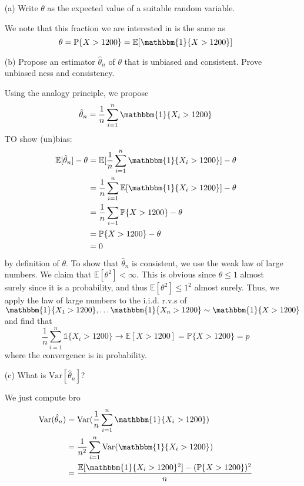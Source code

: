 \documentclass[11pt]{article}
\newcommand{\Var}{\text{Var}}
\newcommand{\bbE}{\mathbb{E}}
\newcommand{\bbP}{\mathbb{P}}
\begin{document}
\begin{enumerate}
    \item[(a)] Write \( \theta \) as the expected value of a suitable random variable.
\begin{solution}
    We note that this fraction we are interested in is the same as
    \[\theta = \bbP\{X >1200\}  = \bbE[\mathbbm{1}\{X>1200\}]\]
\end{solution}
    \item[(b)] Propose an estimator \( \hat{\theta}_n \) of \( \theta \) that is unbiased and consistent. Prove unbiased ness and consistency.
    \begin{solution}
        Using the analogy principle, we propose 
        \[\hat{\theta}_n = \frac{1}{n} \sum_{i=1}^n \mathbbm{1}\{X_i >1200\}\] TO show (un)bias:
        \begin{align*}
            \bbE[\hat{\theta}_n] - \theta &= \bbE[\frac{1}{n} \sum_{i=1}^n \mathbbm{1}\{X_i >1200\}] - \theta\\
            &= \frac{1}{n} \sum_{i=1}^n \bbE[\mathbbm{1}\{X_i > 1200\}] - \theta\\
            &= \frac{1}{n}\sum_{i-1} \bbP\{X > 1200\} - \theta\\
            &= \bbP\{X >1200\} - \theta\\
            &= 0
        \end{align*} by definition of $\theta$. To show that $\hat{\theta}_n$ is consistent, we use the weak law of large numbers. We claim that $\bbE[\theta^2] < \infty.$ This is obvious since $\theta \leq 1$ almost surely since it is a probability, and thus $\bbE[\theta^2] \leq 1^2$ almost surely. Thus, we apply the law of large numbers to the i.i.d. r.v.s of $\mathbbm{1}\{X_1>1200\}, \dots \mathbbm{1}\{X_n >1200\}\sim \mathbbm{1}\{X >1200\}$ and find that
        \[\frac{1}{n}\sum_{i=1}^n \mathbb{1}\{X_i >1200\} \to \bbE[X >1200] = \bbP\{X >1200\} = p\] where the convergence is in probability. 
    \end{solution}
    \item[(c)] What is \( \text{Var}[\hat{\theta}_n] \)?
\begin{solution}
    We just compute bro
    \begin{align*}
        \Var(\hat{\theta}_n) &= \Var(\frac{1}{n} \sum_{i=1}^n \mathbbm{1}\{X_i >1200\})\\
        &= \frac{1}{n^2}\sum_{i=1}^n \Var(\mathbbm{1}\{X_i >1200\})\\
        &= \frac{\bbE[\mathbbm{1}\{X_i >1200\}^2] - (\bbP\{X >1200\})^2}{n}\\

\end{align*}
\end{solution}
\end{enumerate}
\end{document}
